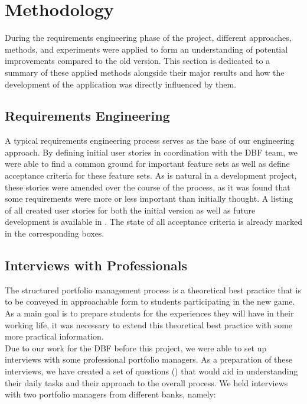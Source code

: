 \section{Methodology}
\label{sec:methodology}

During the requirements engineering phase of the project, different approaches, methods, and experiments were applied to form an understanding of potential improvements compared to the old version. This section is dedicated to a summary of these applied methods alongside their major results and how the development of the application was directly influenced by them.


\subsection{Requirements Engineering}
A typical requirements engineering process serves as the base of our engineering approach. By defining initial user stories in coordination with the DBF team, we were able to find a common ground for important feature sets as well as define acceptance criteria for these feature sets. As is natural in a development project, these stories were amended over the course of the process, as it was found that some requirements were more or less important than initially thought. A listing of all created user stories for both the initial version as well as future development is available in . The state of all acceptance criteria is already marked in the corresponding boxes.


\subsection{Interviews with Professionals}
The structured portfolio management process is a theoretical best practice that is to be conveyed in approachable form to students participating in the new game. As a main goal is to prepare students for the experiences they will have in their working life, it was necessary to extend this theoretical best practice with some more practical information. \\

Due to our work for the DBF before this project, we were able to set up interviews with some professional portfolio managers. As a preparation of these interviews, we have created a set of questions () that would aid in understanding their daily tasks and their approach to the overall process. We held interviews with two portfolio managers from different banks, namely:


